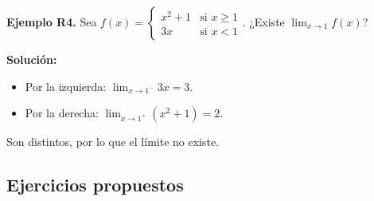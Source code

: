 \documentclass[12pt, letterpaper]{article}
\begin{document}
\textbf{Ejemplo R4.} Sea $f(x) = \begin{cases} x^2 + 1 & \text{si } x \ge 1 \\ 3x & \text{si } x < 1 \end{cases}$. ¿Existe $\lim_{x \to 1} f(x)$?

\begin{cuadrosolucion}
  \textbf{Solución:}
  \begin{itemize}
    \item Por la izquierda: $\lim_{x \to 1^-} 3x = 3$.
    \item Por la derecha: $\lim_{x \to 1^+} (x^2 + 1) = 2$.
  \end{itemize}
  Son distintos, por lo que el límite no existe.
\end{cuadrosolucion}

\subsection{Ejercicios propuestos}
\end{document}
